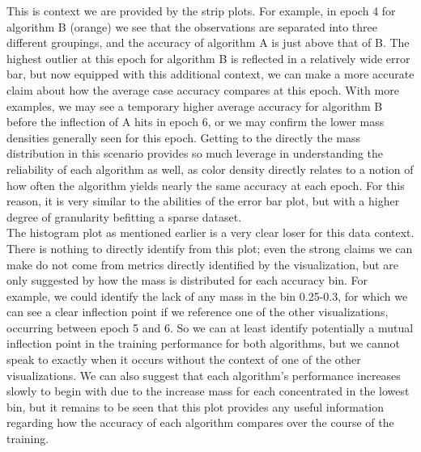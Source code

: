 This is context we are provided by the strip plots. For example, in epoch 4 for algorithm B (orange) we see that the observations are separated into three different groupings, and the accuracy of algorithm A is just above that of B. The highest outlier at this epoch for algorithm B is reflected in a relatively wide error bar, but now equipped with this additional context, we can make a more accurate claim about how the average case accuracy compares at this epoch. With more examples, we may see a temporary higher average accuracy for algorithm B before the inflection of A hits in epoch 6, or we may confirm the lower mass densities generally seen for this epoch. Getting to the directly the mass distribution in this scenario provides so much leverage in understanding the reliability of each algorithm as well, as color density directly relates to a notion of how often the algorithm yields nearly the same accuracy at each epoch. For this reason, it is very similar to the abilities of the error bar plot, but with a higher degree of granularity befitting a sparse dataset. \\

The histogram plot as mentioned earlier is a very clear loser for this data context. There is nothing to directly identify from this plot; even the strong claims we can make do not come from metrics directly identified by the visualization, but are only suggested by how the mass is distributed for each accuracy bin. For example, we could identify the lack of any mass in the bin 0.25-0.3, for which we can see a clear inflection point if we reference one of the other visualizations, occurring between epoch 5 and 6. So we can at least identify potentially a mutual inflection point in the training performance for both algorithms, but we cannot speak to exactly when it occurs without the context of one of the other visualizations. We can also suggest that each algorithm's performance increases slowly to begin with due to the increase mass for each concentrated in the lowest bin, but it remains to be seen that this plot provides any useful information regarding how the accuracy of each algorithm compares over the course of the training.
\newpage
